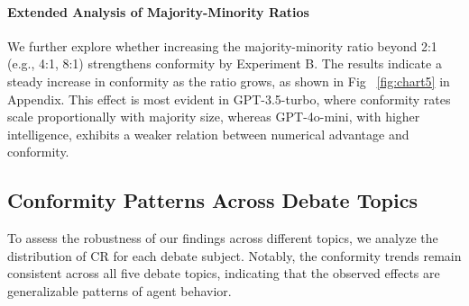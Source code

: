 \documentclass[11pt]{article}
\begin{document}




\paragraph{Extended Analysis of Majority-Minority Ratios}

We further explore whether increasing the majority-minority ratio beyond 2:1 (e.g., 4:1, 8:1) strengthens conformity by Experiment B. The results indicate a steady increase in conformity as the ratio grows, as shown in Fig ~\ref{fig:chart5} in Appendix. This effect is most evident in GPT-3.5-turbo, where conformity rates scale proportionally with majority size, whereas GPT-4o-mini, with higher intelligence, exhibits a weaker relation between numerical advantage and conformity.

\subsection{Conformity Patterns Across Debate Topics}

To assess the robustness of our findings across different topics, we analyze the distribution of CR for each debate subject. Notably, the conformity trends remain consistent across all five debate topics, indicating that the observed effects are generalizable patterns of agent behavior.
\end{document}
